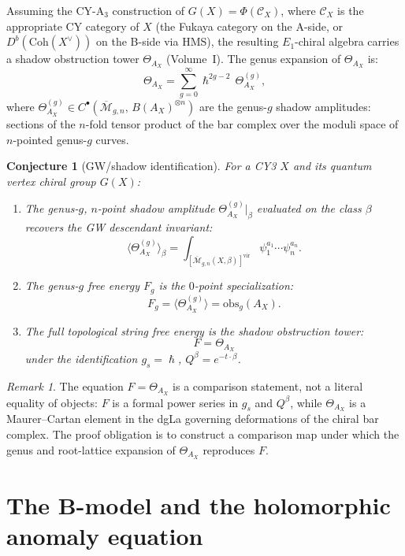 \documentclass[11pt]{amsart}
\theoremstyle{plain}
\newtheorem{conjecture}[theorem]{Conjecture}
\theoremstyle{definition}
\theoremstyle{remark}
\newtheorem{remark}[theorem]{Remark}
\newcommand{\Coh}{\mathrm{Coh}}
\newcommand{\cC}{\mathcal{C}}
\renewcommand{\hbar}{\hslash}
\newcommand{\Mbar}{\overline{\mathcal{M}}}
\begin{document}
Assuming the CY-A$_3$ construction of
$G(X)=\Phi(\cC_X)$, where $\cC_X$ is the appropriate CY category of
$X$ (the Fukaya category on the A-side, or $D^b(\Coh(X^\vee))$ on the
B-side via HMS), the resulting $E_1$-chiral algebra carries a shadow
obstruction tower $\Theta_{A_X}$ (Volume~I). The genus expansion of
$\Theta_{A_X}$ is:
\begin{equation}\label{eq:theta-genus}
 \Theta_{A_X} = \sum_{g=0}^{\infty} \hbar^{2g-2}\, \Theta^{(g)}_{A_X},
\end{equation}
where $\Theta^{(g)}_{A_X} \in
C^\bullet(\Mbar_{g,n},\, B(A_X)^{\otimes n})$ are the genus-$g$ shadow
amplitudes: sections of the $n$-fold tensor product of the bar complex
over the moduli space of $n$-pointed genus-$g$ curves.

\begin{conjecture}[GW/shadow identification]
\label{conj:gw-shadow}
For a CY3 $X$ and its quantum vertex chiral group $G(X)$:
\begin{enumerate}[label=(\roman*)]
 \item The genus-$g$, $n$-point shadow amplitude
 $\Theta^{(g)}_{A_X}|_{\beta}$ evaluated on the class $\beta$ recovers the
 GW descendant invariant:
 \[
 \langle \Theta^{(g)}_{A_X} \rangle_\beta
 = \int_{[\Mbar_{g,n}(X,\beta)]^{\mathrm{vir}}} \psi_1^{a_1}
 \cdots \psi_n^{a_n}.
 \]
 \item The genus-$g$ free energy $F_g$ is the $0$-point specialization:
 \[
 F_g = \langle \Theta^{(g)}_{A_X} \rangle
 = \mathrm{obs}_g(A_X).
 \]
 \item The full topological string free energy is the shadow obstruction tower:
 \[
 F = \Theta_{A_X}
 \]
 under the identification $g_s = \hbar$, $Q^\beta = e^{-t \cdot \beta}$.
\end{enumerate}
\end{conjecture}

\begin{remark}
The equation $F = \Theta_{A_X}$ is a comparison statement, not a literal
equality of objects: $F$ is a
formal power series in $g_s$ and $Q^\beta$, while $\Theta_{A_X}$ is a
Maurer--Cartan element in the dgLa governing deformations of the chiral bar
complex. The proof obligation is to construct a comparison map under which
the genus and root-lattice expansion of $\Theta_{A_X}$ reproduces $F$.
\end{remark}


\section{The B-model and the holomorphic anomaly equation}
\label{sec:b-model}
\end{document}
